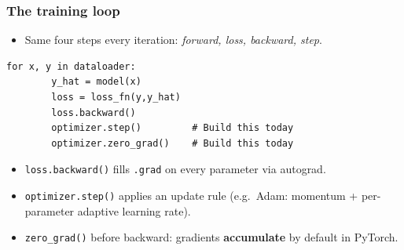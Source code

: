 \begin{frame}[fragile]
    \frametitle{The training loop}
    \begin{itemize}
        \item Same four steps every iteration: \textit{forward, loss, backward, step}.
    \end{itemize}
    \begin{block}{}
    \begin{lstlisting}[basicstyle=\small\ttfamily]
    for x, y in dataloader:                
        y_hat = model(x)                   
        loss = loss_fn(y,y_hat)
        loss.backward()          
        optimizer.step()         # Build this today
        optimizer.zero_grad()    # Build this today
    \end{lstlisting}
    \end{block}
    \pause
    \begin{itemize}
        \item \texttt{loss.backward()} fills \texttt{.grad} on every parameter via
        autograd.
        \pause
        \item \texttt{optimizer.step()} applies an update rule
        (e.g.\ Adam: momentum + per-parameter adaptive learning rate).
        \pause
        \item \texttt{zero\_grad()} before backward: gradients \textbf{accumulate}
        by default in PyTorch.
    \end{itemize}
    \end{frame}



